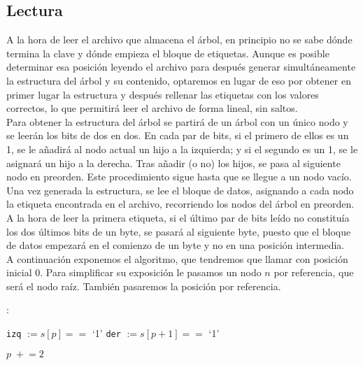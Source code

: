 \documentclass{article}
\newenvironment{algo}{
\vspace*{0.5cm}
\begin{algorithm}[H]}{
\end{algorithm}
\vspace*{0.5cm}
}
\begin{document}
\subsection{Lectura}

A la hora de leer el archivo que almacena el árbol, en principio no se sabe dónde
termina la clave y dónde empieza el bloque de etiquetas. Aunque es posible
determinar esa posición leyendo el archivo para después generar simultáneamente la
estructura del árbol y su contenido, optaremos en lugar de eso por obtener en
primer lugar la estructura y después rellenar las etiquetas con los valores
correctos, lo que permitirá leer el archivo de forma lineal, sin saltos. \\

Para obtener la estructura del árbol se partirá de un árbol con un único nodo y se
leerán los bits de dos en dos. En cada par de bits, si el primero de ellos es un
1, se le añadirá al nodo actual un hijo a la izquierda; y si el segundo es un 1,
se le asignará un hijo a la derecha. Tras añadir (o no) los hijos, se pasa al
siguiente nodo en preorden. Este procedimiento sigue hasta que se llegue a un nodo
vacío. \\

Una vez generada la estructura, se lee el bloque de datos, asignando a cada nodo la
etiqueta encontrada en el archivo, recorriendo los nodos del árbol en preorden. A
la hora de leer la primera etiqueta, si el último par de bits leído no constituía
los dos últimos bits de un byte, se pasará al siguiente byte, puesto que el bloque
de datos empezará en el comienzo de un byte y no en una posición intermedia. \\

A continuación exponemos el algoritmo, que tendremos que llamar con posición
inicial 0.
Para simplificar su exposición le pasamos un nodo $n$ por referencia, que será
el nodo raíz. También pasaremos la posición por referencia.

\begin{algo}
: \\

\BlankLine

\texttt{izq} $ := s[p] == $ `1'\;
\texttt{der} $ := s[p+1] == $ `1'\;
\BlankLine


\BlankLine

$p \;+\!\!= 2$\;

\BlankLine


\end{algo}
\end{document}
